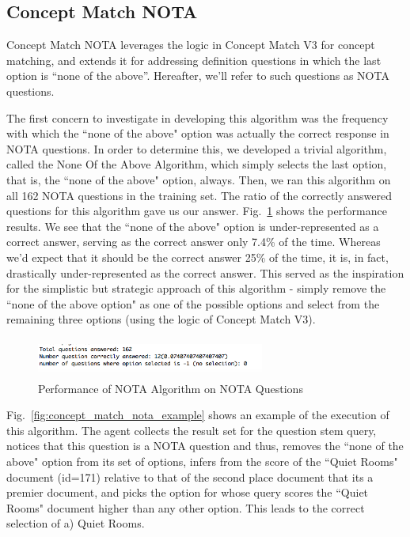 \subsection{Concept Match NOTA}

Concept Match NOTA leverages the logic in Concept Match V3 for concept matching, and extends it for addressing definition questions in which the last option is ``none of the above''.  Hereafter, we'll refer to such questions as NOTA questions.

The first concern to investigate in developing this algorithm was the frequency with which the ``none of the above" option was actually the correct response in NOTA questions.  In order to determine this, we developed a trivial algorithm, called the None Of the Above Algorithm, which simply selects the last option, that is, the ``none of the above" option, always.  Then, we ran this algorithm on all 162 NOTA questions in the training set.  The ratio of the correctly answered questions for this algorithm gave us our answer.  Fig.~\ref{fig:nota_training_set_performance} shows the performance results.  We see that the ``none of the above" option is under-represented as a correct answer, serving as the correct answer only 7.4\% of the time.  Whereas we'd expect that it should be the correct answer 25\% of the time, it is, in fact, drastically under-represented as the correct answer.  This served as the inspiration for the simplistic but strategic approach of this algorithm - simply remove the ``none of the above option" as one of the possible options and select from the remaining three options (using the logic of Concept Match V3).

\begin{figure}
\centering
\vspace{0.75in}
\includegraphics[width=75mm, height=13mm]{nota_training_set_performance.png}
\caption{Performance of NOTA Algorithm on NOTA Questions}
\label{fig:nota_training_set_performance}
\end{figure}


Fig.~\ref{fig:concept_match_nota_example} shows an example of the execution of this algorithm.  The agent collects the result set for the question stem query, notices that this question is a NOTA question and thus, removes the ``none of the above" option from its set of options, infers from the score of the ``Quiet Rooms" document (id=171) relative to that of the second place document that its a premier document, and picks the option for whose query scores the ``Quiet Rooms" document higher than any other option.  This leads to the correct selection of a) Quiet Rooms.


